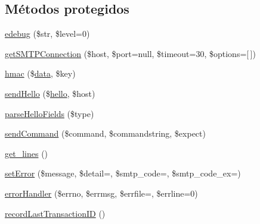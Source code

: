 \subsection*{Métodos protegidos}
\begin{DoxyCompactItemize}
\item 
\hyperlink{classPHPMailer_1_1PHPMailer_1_1SMTP_a428c75f1ab137d95c57567459f51e876}{edebug} (\$str, \$level=0)
\item 
\hyperlink{classPHPMailer_1_1PHPMailer_1_1SMTP_ac323a39de60b32fcd8182f2d499b3bd8}{get\+S\+M\+T\+P\+Connection} (\$host, \$port=null, \$timeout=30, \$options=\mbox{[}$\,$\mbox{]})
\item 
\hyperlink{classPHPMailer_1_1PHPMailer_1_1SMTP_ae097c9420480708994efc030d1dddef1}{hmac} (\$\hyperlink{classPHPMailer_1_1PHPMailer_1_1SMTP_a521b8dadc893ac68f1a3b27e54f7faaa}{data}, \$key)
\item 
\hyperlink{classPHPMailer_1_1PHPMailer_1_1SMTP_af771c3ca46cf4375e425b37649d572d6}{send\+Hello} (\$\hyperlink{classPHPMailer_1_1PHPMailer_1_1SMTP_a7c2586a9df8e7f638c29ba6c52a39008}{hello}, \$host)
\item 
\hyperlink{classPHPMailer_1_1PHPMailer_1_1SMTP_a1e37ec8121884138d43b236545a07ef6}{parse\+Hello\+Fields} (\$type)
\item 
\hyperlink{classPHPMailer_1_1PHPMailer_1_1SMTP_a53c91201465acb8cf92fbfd77f5b169a}{send\+Command} (\$command, \$commandstring, \$expect)
\item 
\hyperlink{classPHPMailer_1_1PHPMailer_1_1SMTP_af3814642674acf0fa2703269b41e502e}{get\+\_\+lines} ()
\item 
\hyperlink{classPHPMailer_1_1PHPMailer_1_1SMTP_af37a69128fef73b63bcbbe5ed1f1e89e}{set\+Error} (\$message, \$detail=\textquotesingle{}\textquotesingle{}, \$smtp\+\_\+code=\textquotesingle{}\textquotesingle{}, \$smtp\+\_\+code\+\_\+ex=\textquotesingle{}\textquotesingle{})
\item 
\hyperlink{classPHPMailer_1_1PHPMailer_1_1SMTP_ab8dc9dad755e8086f5ff1e6358a5cbf1}{error\+Handler} (\$errno, \$errmsg, \$errfile=\textquotesingle{}\textquotesingle{}, \$errline=0)
\item 
\hyperlink{classPHPMailer_1_1PHPMailer_1_1SMTP_a7ca35ef525499613bea7afe470e570bd}{record\+Last\+Transaction\+ID} ()
\end{DoxyCompactItemize}
